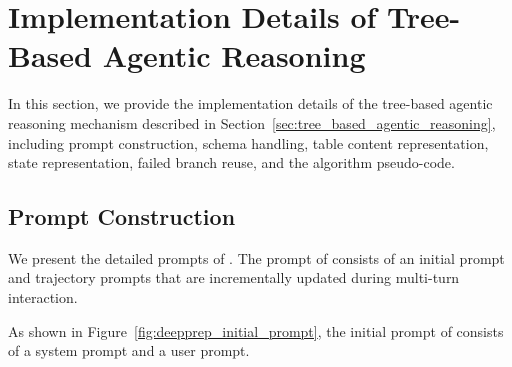 
\section{Implementation Details of Tree-Based Agentic Reasoning}
\label{sec:appendix_agentic_reasoning}

In this section, we provide the implementation details of the tree-based agentic reasoning mechanism described in Section~\ref{sec:tree_based_agentic_reasoning}, including prompt construction, schema handling, table content representation, state representation, failed branch reuse, and the algorithm pseudo-code.

\subsection{Prompt Construction}
\label{subsec:appendix_deepprep_prompt}

We present the detailed prompts of \sys. The prompt of \sys consists of an initial prompt and trajectory prompts that are incrementally updated during multi-turn interaction.




As shown in Figure~\ref{fig:deepprep_initial_prompt}, the initial prompt of \sys consists of a system prompt and a user prompt.

